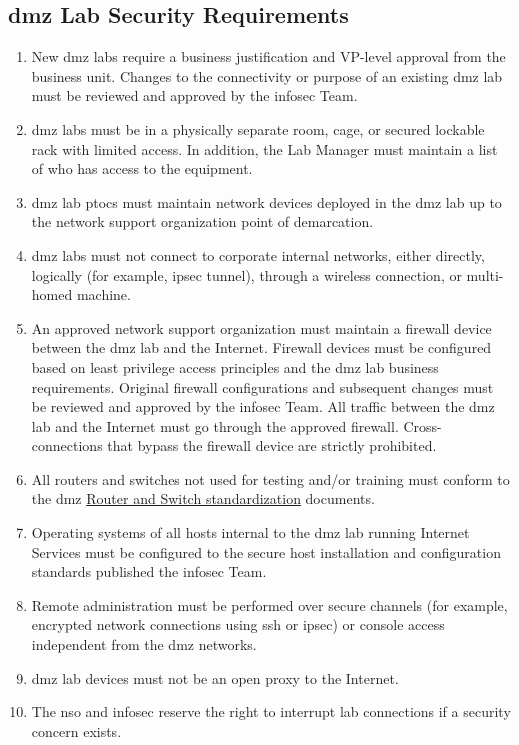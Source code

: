 \subsection{\gls{dmz} Lab Security Requirements}
\begin{enumerate}
\item
New \gls{dmz} labs require a business justification and VP-level approval from the business unit.  
Changes to the connectivity or purpose of an existing \gls{dmz} lab must be reviewed and approved by the \gls{infosec} Team. 
\item
\gls{dmz} labs must be in a physically separate room, cage, or secured lockable rack with limited access.  
In addition, the Lab Manager must maintain a list of who has access to the equipment.
\item
\gls{dmz} lab \gls{ptoc}s must maintain network devices deployed in the \gls{dmz} lab up to the network support organization point of demarcation.
\item
\gls{dmz} labs must not connect to corporate internal networks, either directly, logically (for example, \gls{ipsec} tunnel), through a wireless connection, or multi-homed machine.
\item
An approved network support organization must maintain a firewall device between the \gls{dmz} lab and the Internet.  
Firewall devices must be configured based on least privilege access principles and the \gls{dmz} lab business requirements.  
Original firewall configurations and subsequent changes must be reviewed and approved by the \gls{infosec} Team.  
All traffic between the \gls{dmz} lab and the Internet must go through the approved firewall.  
Cross-connections that bypass the firewall device are strictly prohibited.
\item
All routers and switches not used for testing and/or training must conform to the \gls{dmz} \hyperref[NS:RaSSP]{Router and Switch standardization} documents. 
\item
Operating systems of all hosts internal to the \gls{dmz} lab running Internet Services must be configured to the secure host installation and configuration standards published the \gls{infosec} Team.
\item
Remote administration must be performed over secure channels (for example, encrypted network connections using \gls{ssh} or \gls{ipsec}) or console access independent from the \gls{dmz} networks.
\item
\gls{dmz} lab devices must not be an open proxy to the Internet. 
\item
The \gls{nso} and \gls{infosec} reserve the right to interrupt lab connections if a security concern exists. 
\end{enumerate}
\CommonPolicyCompliance
